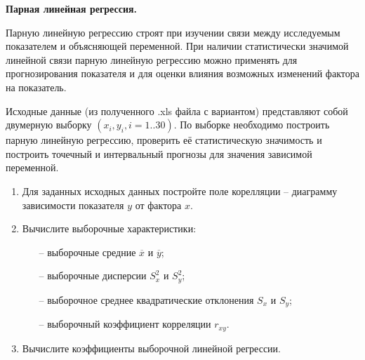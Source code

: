 \textbf{Парная линейная регрессия.}

Парную линейную регрессию строят при изучении связи между исследуемым показателем и
объясняющей переменной. При наличии статистически значимой линейной связи парную
линейную регрессию можно применять для прогнозирования показателя и для оценки влияния
возможных изменений фактора на показатель.

Исходные данные (из полученного .xls файла с вариантом) представляют собой двумерную
выборку $(x_i, y_i, i = 1..30)$. По выборке необходимо построить парную линейную
регрессию, проверить её статистическую значимость и построить точечный и интервальный
прогнозы для значения зависимой переменной.

\begin{enumerate}
	\item Для заданных исходных данных постройте поле корелляции -- диаграмму зависимости
        показателя $y$ от фактора $x$. 

    \item Вычислите выборочные характеристики:
    \begin{itemize}
        \item[--] выборочные средние $\overline{x}$ и $\overline{y}$;
        \item[--] выборочные дисперсии $S_x^{2}$ и $S_y^{2}$;
        \item[--] выборочное среднее квадратические отклонения $S_x$ и $S_y$;
        \item[--] выборочный коэффициент корреляции $r_{xy}$.
    \end{itemize}

    \item Вычислите коэффициенты выборочной линейной регрессии.
\end{enumerate}
